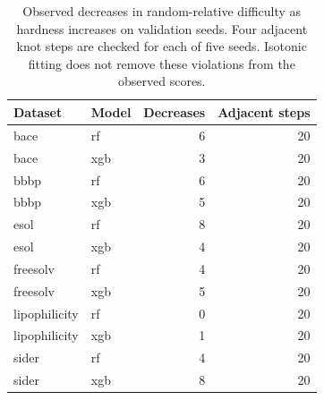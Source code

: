 \begin{table}[htbp]\centering\small
\begin{tabular}{llrr}
\toprule
Dataset & Model & Decreases & Adjacent steps \\
\midrule
bace & rf & 6 & 20 \\
bace & xgb & 3 & 20 \\
bbbp & rf & 6 & 20 \\
bbbp & xgb & 5 & 20 \\
esol & rf & 8 & 20 \\
esol & xgb & 4 & 20 \\
freesolv & rf & 4 & 20 \\
freesolv & xgb & 5 & 20 \\
lipophilicity & rf & 0 & 20 \\
lipophilicity & xgb & 1 & 20 \\
sider & rf & 4 & 20 \\
sider & xgb & 8 & 20 \\
\bottomrule
\end{tabular}

\caption{Observed decreases in random-relative difficulty as hardness increases on validation seeds. Four adjacent knot steps are checked for each of five seeds. Isotonic fitting does not remove these violations from the observed scores.}\end{table}
